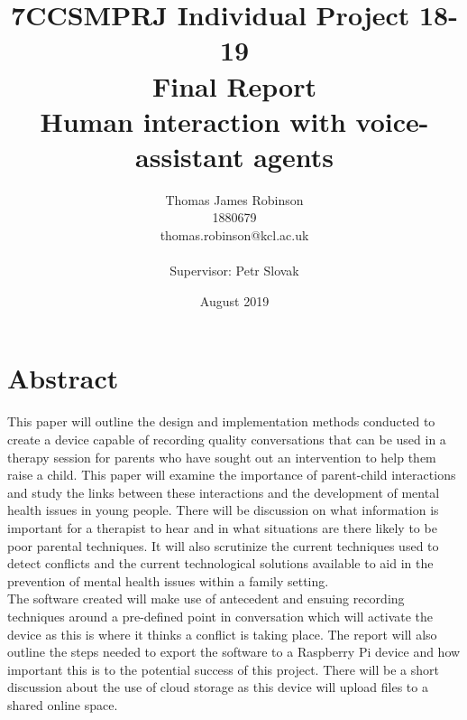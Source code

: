 \documentclass[a4paper,11pt]{report}
\begin{document}
\title{%
	7CCSMPRJ Individual Project 18-19\\
	Final Report \\
	\vspace{1mm}
	\LARGE Human interaction with voice-assistant agents}

\author{%
	\LARGE Thomas James Robinson\\
	1880679\\
	thomas.robinson@kcl.ac.uk\\
	\vspace{5mm}\\
	Supervisor: Petr Slovak
	}

\date{August 2019}

\maketitle

\chapter*{Abstract}%
%
This paper will outline the design and implementation methods conducted to create a device capable of recording quality conversations that can be used in a therapy session for parents who have sought out an intervention to help them raise a child. This paper will examine the importance of parent-child interactions and study the links between these interactions and the development of mental health issues in young people. There will be discussion on what information is important for a therapist to hear and in what situations are there likely to be poor parental techniques. It will also scrutinize the current techniques used to detect conflicts and the current technological solutions available to aid in the prevention of mental health issues within a family setting. \\

The software created will make use of antecedent and ensuing recording techniques around a pre-defined point in conversation which will activate the device as this is where it thinks a conflict is taking place. The report will also outline the steps needed to export the software to a Raspberry Pi device and how important this is to the potential success of this project. There will be a short discussion about the use of cloud storage as this device will upload files to a shared online space.\\
\end{document}
